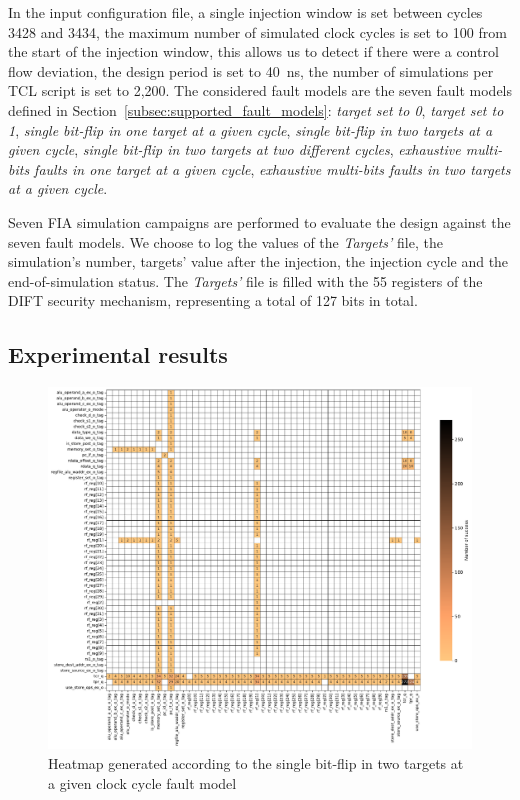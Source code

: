 In the input configuration file, a single injection window is set between cycles 3428 and 3434, the maximum number of simulated clock cycles is set to 100 from the start of the injection window, this allows us to detect if there were a control flow deviation, the design period is set to 40~ns, the number of simulations per TCL script is set to 2,200. The considered fault models are the seven fault models defined in Section~\ref{subsec:supported_fault_models}: \textit{target set to 0}, \textit{target set to 1}, \textit{single bit-flip in one target at a given cycle}, \textit{single bit-flip in two targets at a given cycle}, \textit{single bit-flip in two targets at two different cycles}, \textit{exhaustive multi-bits faults in one target at a given cycle}, \textit{exhaustive multi-bits faults in two targets at a given cycle}.

Seven FIA simulation campaigns are performed to evaluate the design against the seven fault models.
We choose to log the values of the \textit{Targets'} file, the simulation's number, targets' value after the injection, the injection cycle and the end-of-simulation status.
The \textit{Targets'} file is filled with the 55 registers of the DIFT security mechanism, representing a total of 127 bits in total.

\subsection{Experimental results} 
\label{subsec:results}

\begin{figure}[t]
    \centering
    \includegraphics[width=\textwidth]{c4_fissa/img/heatmap/heatmap_buffer_overflow_wop_1_single_bitflip_spatial_2.pdf}
    \caption{Heatmap generated according to the single bit-flip in two targets at a given clock cycle fault model}
    \label{fig:heatmap_spatial}
\end{figure}

